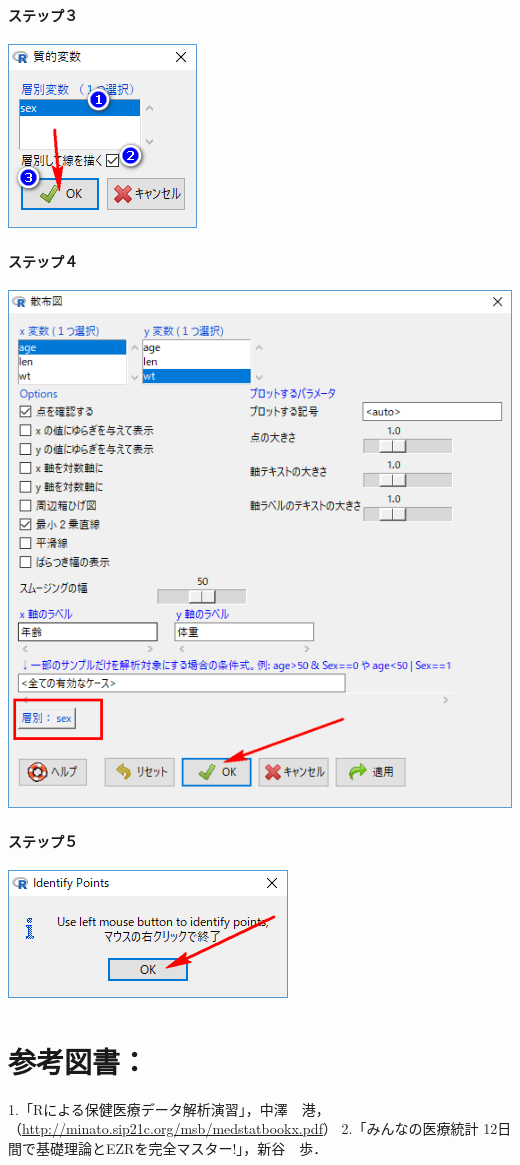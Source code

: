 \documentclass[11pt,]{problemset}
\let\oldparagraph\paragraph
\renewcommand{\paragraph}[1]{\oldparagraph{#1}\mbox{}}
\begin{document}
\hypertarget{section-32}{%
\paragraph{ステップ３}\label{section-32}}

\begin{center}\includegraphics[width=0.15\linewidth]{pic/scatter05} \end{center}

\hypertarget{section-33}{%
\paragraph{ステップ４}\label{section-33}}

\begin{center}\includegraphics[width=0.4\linewidth]{pic/scatter06} \end{center}

\hypertarget{section-34}{%
\paragraph{ステップ５}\label{section-34}}

\begin{center}\includegraphics[width=0.15\linewidth]{pic/scatter07} \end{center}

\newpage
\vfill

\hypertarget{section-35}{%
\section{参考図書：}\label{section-35}}

1.「Rによる保健医療データ解析演習」，中澤　港，（\url{http://minato.sip21c.org/msb/medstatbookx.pdf}）
2.「みんなの医療統計 12日間で基礎理論とEZRを完全マスター!」，新谷　歩．
\end{document}
